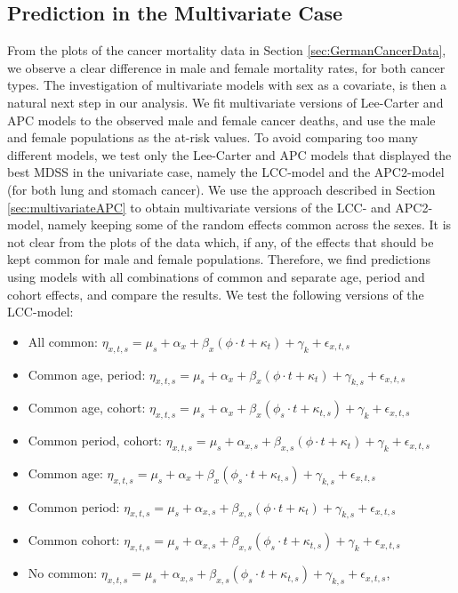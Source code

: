 \newpage
\subsection{Prediction in the Multivariate Case}
\label{sec:pred-mv}

From the plots of the cancer mortality data in Section \ref{sec:GermanCancerData}, we observe a clear difference in male and female mortality rates, for both cancer types. The investigation of multivariate models with sex as a covariate, is then a natural next step in our analysis. We fit multivariate versions of Lee-Carter and APC models to the observed male and female cancer deaths, and use the male and female populations as the at-risk values. To avoid comparing too many different models, we test only the Lee-Carter and APC models that displayed the best MDSS in the univariate case, namely the LCC-model and the APC2-model (for both lung and stomach cancer). We use the approach described in Section \ref{sec:multivariateAPC} to obtain multivariate versions of the LCC- and APC2-model, namely keeping some of the random effects common across the sexes. It is not clear from the plots of the data which, if any, of the effects that should be kept common for male and female populations. Therefore, we find predictions using models with all combinations of common and separate age, period and cohort effects, and compare the results. We test the following versions of the LCC-model:
\begin{itemize}
    \item All common: $\eta_{x,t,s} = \mu_s + \alpha_x + \beta_x(\phi\cdot t + \kappa_t) + \gamma_k + \epsilon_{x,t,s}$
    \item Common age, period: $\eta_{x,t,s} = \mu_s + \alpha_x + \beta_x(\phi\cdot t + \kappa_t) + \gamma_{k,s} + \epsilon_{x,t,s}$
    \item Common age, cohort: $\eta_{x,t,s} = \mu_s + \alpha_x + \beta_x(\phi_s\cdot t + \kappa_{t,s}) + \gamma_{k} + \epsilon_{x,t,s}$
    \item Common period, cohort: $\eta_{x,t,s} = \mu_s + \alpha_{x,s} + \beta_{x,s}(\phi\cdot t + \kappa_t) + \gamma_{k} + \epsilon_{x,t,s}$
    \item Common age: $\eta_{x,t,s} = \mu_s + \alpha_x + \beta_x(\phi_s\cdot t + \kappa_{t,s}) + \gamma_{k,s} + \epsilon_{x,t,s}$
    \item Common period: $\eta_{x,t,s} = \mu_s + \alpha_{x,s} + \beta_{x,s}(\phi\cdot t + \kappa_{t}) + \gamma_{k,s} + \epsilon_{x,t,s}$
    \item Common cohort: $\eta_{x,t,s} = \mu_s + \alpha_{x,s} + \beta_{x,s}(\phi_s\cdot t + \kappa_{t,s}) + \gamma_{k} + \epsilon_{x,t,s}$
    \item No common: $\eta_{x,t,s} = \mu_s + \alpha_{x,s} + \beta_{x,s}(\phi_s\cdot t + \kappa_{t,s}) + \gamma_{k,s} + \epsilon_{x,t,s}$,
\end{itemize}
